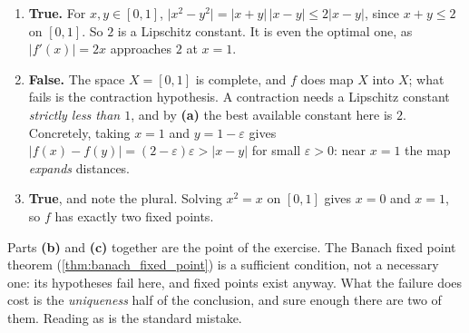 \begin{exercisesolution}
\label{sol:banach_hypotheses_true_false}
\begin{enumerate}[label=\textbf{(\alph*)}]
  \item \textbf{True.} For $x,y \in [0,1]$,
    $\lvert x^2 - y^2\rvert = \lvert x+y\rvert\,\lvert x-y\rvert \le 2\lvert x-y\rvert$,
    since $x + y \le 2$ on $[0,1]$. So $2$ is a Lipschitz constant. It is even the optimal one, as
    $\lvert f'(x)\rvert = 2x$ approaches $2$ at $x = 1$.
  \item \textbf{False.} The space $X = [0,1]$ is complete, and $f$ does map $X$ into $X$; what fails
    is the contraction hypothesis. A contraction needs a Lipschitz constant \emph{strictly less
    than $1$}, and by \textbf{(a)} the best available constant here is $2$. Concretely, taking
    $x = 1$ and $y = 1 - \varepsilon$ gives
    $\lvert f(x) - f(y)\rvert = (2-\varepsilon)\varepsilon > \lvert x - y\rvert$ for small
    $\varepsilon > 0$: near $x = 1$ the map \emph{expands} distances.
  \item \textbf{True}, and note the plural. Solving $x^2 = x$ on $[0,1]$ gives $x = 0$ and
    $x = 1$, so $f$ has exactly two fixed points.
\end{enumerate}
\begin{remark}
Parts \textbf{(b)} and \textbf{(c)} together are the point of the exercise. The Banach fixed point
theorem (\cref{thm:banach_fixed_point}) is a sufficient condition, not a necessary one: its
hypotheses fail here, and fixed points exist anyway. What the failure does cost is the
\emph{uniqueness} half of the conclusion, and sure enough there are two of them. Reading  as  is the standard mistake.
\end{remark}
\end{exercisesolution}

